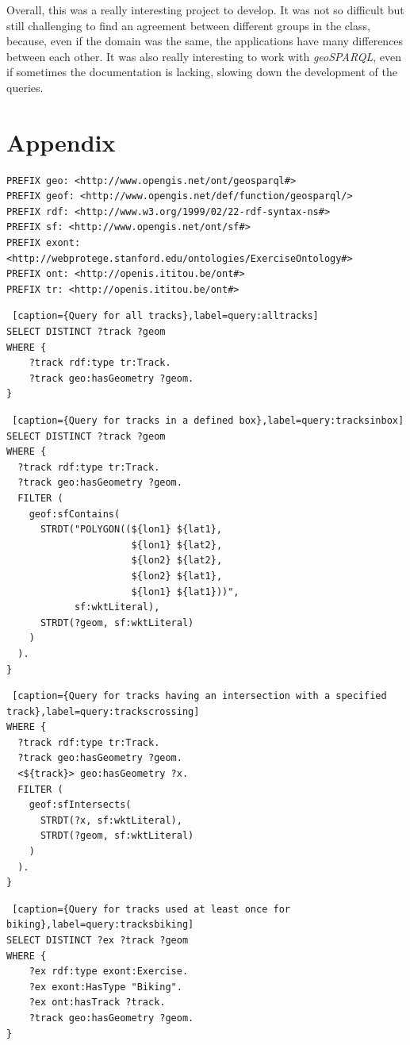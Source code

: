 \documentclass[11pt,a4paper]{scrreprt}
\begin{document}
Overall, this was a really interesting project to develop. 
It was not so difficult but still challenging to find an agreement between different groups in the class, because, even if the domain was the same, the applications have many differences between each other.
It was also really interesting to work with \textit{geoSPARQL}, even if sometimes the documentation is lacking, slowing down the development of the queries.


\chapter*{Appendix}
\begin{lstlisting}[caption={Prefixes used in the hereinbelow queries},label=query:prefixes]
PREFIX geo: <http://www.opengis.net/ont/geosparql#>
PREFIX geof: <http://www.opengis.net/def/function/geosparql/>
PREFIX rdf: <http://www.w3.org/1999/02/22-rdf-syntax-ns#>
PREFIX sf: <http://www.opengis.net/ont/sf#>
PREFIX exont: <http://webprotege.stanford.edu/ontologies/ExerciseOntology#>
PREFIX ont: <http://openis.ititou.be/ont#>
PREFIX tr: <http://openis.ititou.be/ont#>
\end{lstlisting}
\begin{lstlisting} [caption={Query for all tracks},label=query:alltracks]
SELECT DISTINCT ?track ?geom
WHERE {
    ?track rdf:type tr:Track.
    ?track geo:hasGeometry ?geom.
}
\end{lstlisting}

\begin{lstlisting} [caption={Query for tracks in a defined box},label=query:tracksinbox]
SELECT DISTINCT ?track ?geom
WHERE {
  ?track rdf:type tr:Track.
  ?track geo:hasGeometry ?geom.
  FILTER (
    geof:sfContains(
      STRDT("POLYGON((${lon1} ${lat1}, 
      				  ${lon1} ${lat2}, 
      				  ${lon2} ${lat2}, 
      				  ${lon2} ${lat1}, 
      				  ${lon1} ${lat1}))", 
      	    sf:wktLiteral),
      STRDT(?geom, sf:wktLiteral)
    )
  ).
}
\end{lstlisting}

\begin{lstlisting} [caption={Query for tracks having an intersection with a specified track},label=query:trackscrossing]
WHERE {
  ?track rdf:type tr:Track.
  ?track geo:hasGeometry ?geom.
  <${track}> geo:hasGeometry ?x.
  FILTER (
    geof:sfIntersects(
      STRDT(?x, sf:wktLiteral),
      STRDT(?geom, sf:wktLiteral)
    )
  ).
}
\end{lstlisting}
\begin{lstlisting} [caption={Query for tracks used at least once for biking},label=query:tracksbiking]
SELECT DISTINCT ?ex ?track ?geom
WHERE {
    ?ex rdf:type exont:Exercise.
    ?ex exont:HasType "Biking".
    ?ex ont:hasTrack ?track.
    ?track geo:hasGeometry ?geom.
}
\end{lstlisting}
\end{document}
